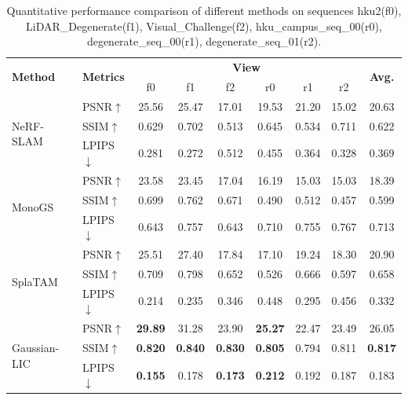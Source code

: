 \documentclass[lettersize,journal]{IEEEtran}
\begin{document}
\begin{table}[htp]
    \centering
    \renewcommand{\arraystretch}{1.0} %
    \setlength{\tabcolsep}{12pt} %
    \caption{Quantitative performance comparison of different methods on sequences hku2(f0), LiDAR_Degenerate(f1), Visual_Challenge(f2), hku_campus_seq_00(r0), degenerate_seq_00(r1), degenerate_seq_01(r2).}
    \label{tab:quantitativecomparison1}
    \begin{tabular}{@{}llccccccc@{}} %
        \toprule
        \multirow{2}{*}{\textbf{Method}} & \multirow{2}{*}{\textbf{Metrics}} & \multicolumn{6}{c}{\textbf{View}} & \multirow{2}{*}{\textbf{Avg.}} \\
        \cmidrule(lr){3-8}
        & & f0 & f1 & f2 & r0 & r1 & r2 &  \\
        \midrule
        \multirow{3}{*}{NeRF-SLAM\cite{nerfslam}} & PSNR$\uparrow$ & 25.56 & 25.47 & 17.01 & 19.53 & 21.20 & 15.02 & 20.63 \\
        & SSIM$\uparrow$ & 0.629 & 0.702 & 0.513 & 0.645 & 0.534 & 0.711 & 0.622 \\
        & LPIPS$\downarrow$ & 0.281 & 0.272 & 0.512 & 0.455 & 0.364 & 0.328 & 0.369 \\
        \midrule
        \multirow{3}{*}{MonoGS\cite{monogs}} & PSNR$\uparrow$ & 23.58 & 23.45 & 17.04 & 16.19 & 15.03 & 15.03 & 18.39 \\
        & SSIM$\uparrow$ & 0.699 & 0.762 & 0.671 & 0.490 & 0.512 & 0.457 & 0.599 \\
        & LPIPS$\downarrow$ & 0.643 & 0.757 & 0.643 & 0.710 & 0.755 & 0.767 & 0.713 \\
        \midrule
        \multirow{3}{*}{SplaTAM\cite{splatam}} & PSNR$\uparrow$ & 25.51 & 27.40 & 17.84 & 17.10 & 19.24 & 18.30 & 20.90 \\
        & SSIM$\uparrow$ & 0.709 & 0.798 & 0.652 & 0.526 & 0.666 & 0.597 & 0.658 \\
        & LPIPS$\downarrow$ & 0.214 & 0.235 & 0.346 & 0.448 & 0.295 & 0.456 & 0.332 \\
        \midrule
        \multirow{3}{*}{Gaussian-LIC\cite{gaussianlic}} & PSNR$\uparrow$ & \textbf{29.89} & 31.28 & 23.90 & \textbf{25.27} & 22.47 & 23.49 & 26.05 \\
        & SSIM$\uparrow$ & \textbf{0.820} & \textbf{0.840} & \textbf{0.830} & \textbf{0.805} & 0.794 & 0.811 & \textbf{0.817} \\
        & LPIPS$\downarrow$ & \textbf{0.155} & 0.178 & \textbf{0.173} & \textbf{0.212} & 0.192 & 0.187 & 0.183 \\

\end{tabular}
\end{table}
\end{document}
